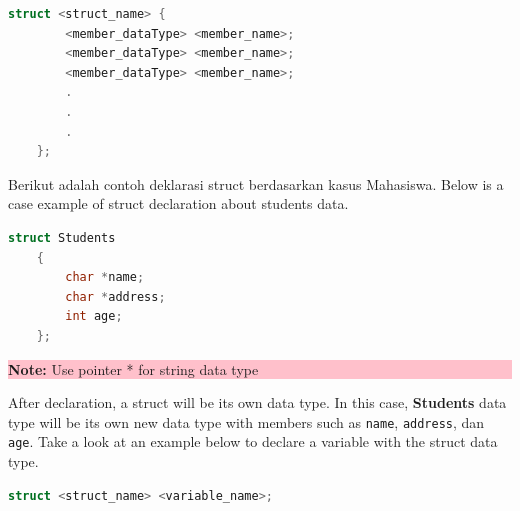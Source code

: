 \begin{lstlisting}[language=c]
    struct <struct_name> {
        <member_dataType> <member_name>;
        <member_dataType> <member_name>;
        <member_dataType> <member_name>;
        .
        .
        .
    };
    \end{lstlisting}

Berikut adalah contoh deklarasi struct berdasarkan kasus Mahasiswa.
Below is a case example of struct declaration about students data.
\begin{lstlisting}[language=c]
    struct Students
    {
        char *name;
        char *address;
        int age;
    };
    \end{lstlisting}
\begin{center}
    \colorbox{pink}{\parbox{0.8\linewidth}{\textbf{Note:}  Use pointer * for string data type}}
\end{center}

After declaration, a struct will be its own data type. In this case, \textbf{Students} data type will be its own new data type
with members such as \verb|name|, \verb|address|, dan \verb|age|. Take a look at an example below to declare a variable
with the struct data type.

\begin{lstlisting}[language=c]
    struct <struct_name> <variable_name>;
\end{lstlisting}

